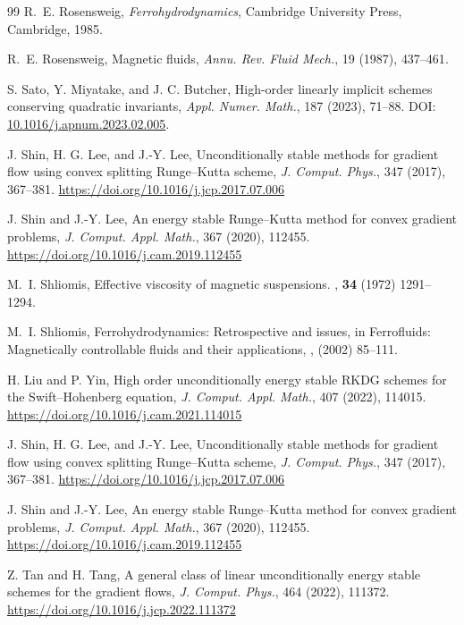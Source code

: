 \documentclass[11pt,a4paper]{article}
\newif\ifmarkchanges
\newcommand{\rev}[1]{{\ifmarkchanges\color{blue}\fi#1}}
\theoremstyle{definition}
\numberwithin{equation}{section}
\begin{document}
\begin{thebibliography}{99}
R.~E. Rosensweig,
\emph{Ferrohydrodynamics}, Cambridge University Press, Cambridge, 1985.

R.~E. Rosensweig,
Magnetic fluids, \emph{Annu. Rev. Fluid Mech.}, 19 (1987), \rev{437--461}.

S. Sato, Y. Miyatake, and J. C. Butcher,
High-order linearly implicit schemes conserving quadratic invariants,
\emph{Appl. Numer. Math.}, 187 (2023), 71--88.
DOI: \href{https://doi.org/10.1016/j.apnum.2023.02.005}{10.1016/j.apnum.2023.02.005}.


J. Shin, H. G. Lee, and J.-Y. Lee,
Unconditionally stable methods for gradient flow using convex
splitting Runge--Kutta scheme,
\emph{J. Comput. Phys.}, 347 (2017), 367--381.
\url{https://doi.org/10.1016/j.jcp.2017.07.006}

J. Shin and J.-Y. Lee,
An energy stable Runge--Kutta method for convex gradient problems,
\emph{J. Comput. Appl. Math.}, 367 (2020), 112455.
\url{https://doi.org/10.1016/j.cam.2019.112455}

M.~I. Shliomis,
\newblock Effective viscosity of magnetic suspensions.
, {\bf 34} (1972) 1291--1294.

M.~I. Shliomis,
\newblock Ferrohydrodynamics: Retrospective and issues, in Ferrofluids: Magnetically controllable fluids and their applications,
, (2002) 85--111.

H. Liu and P. Yin,
High order unconditionally energy stable RKDG schemes for the
Swift--Hohenberg equation,
\emph{J. Comput. Appl. Math.}, 407 (2022), 114015.
\url{https://doi.org/10.1016/j.cam.2021.114015}

J. Shin, H. G. Lee, and J.-Y. Lee,
Unconditionally stable methods for gradient flow using convex
splitting Runge--Kutta scheme,
\emph{J. Comput. Phys.}, 347 (2017), 367--381.
\url{https://doi.org/10.1016/j.jcp.2017.07.006}

J. Shin and J.-Y. Lee,
An energy stable Runge--Kutta method for convex gradient problems,
\emph{J. Comput. Appl. Math.}, 367 (2020), 112455.
\url{https://doi.org/10.1016/j.cam.2019.112455}

Z. Tan and H. Tang,
A general class of linear unconditionally energy stable schemes for
the gradient flows,
\emph{J. Comput. Phys.}, 464 (2022), 111372.
\url{https://doi.org/10.1016/j.jcp.2022.111372}


\end{thebibliography}
\end{document}
